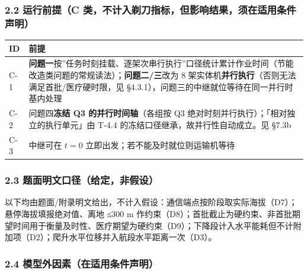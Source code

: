 \documentclass[
  10.5pt,
]{extarticle}
\newcounter{none} %
\begin{document}
\subsubsection{2.2 运行前提（C
类，不计入剃刀指标，但影响结果，须在适用条件声明）}\label{ux8fd0ux884cux524dux63d0c-ux7c7bux4e0dux8ba1ux5165ux5243ux5200ux6307ux6807ux4f46ux5f71ux54cdux7ed3ux679cux987bux5728ux9002ux7528ux6761ux4ef6ux58f0ux660e}

{\def\LTcaptype{none} %
\begin{longtable}[]{@{}
  >{\raggedright\arraybackslash}p{}
  >{\raggedright\arraybackslash}p{}@{}}
\toprule\noalign{}
\begin{minipage}[b]{\linewidth}\raggedright
ID
\end{minipage} & \begin{minipage}[b]{\linewidth}\raggedright
前提
\end{minipage} \\
\midrule\noalign{}
\endhead
\bottomrule\noalign{}
\endlastfoot
C-1 &
\textbf{问题一}按''任务时刻挂载、逐架次串行执行''口径统计累计作业时间（节能改造类问题的常规读法）；\textbf{问题二/三}改为
8 架实体机\textbf{并行执行}（否则无法满足首批/医疗硬时限，见
§4.3.1），问题三的中继就位等待在同一并行时基内处理 \\
C-2 & 问题四\textbf{冻结 Q3 的并行时间轴}（各组按 Q3
绝对时刻并行执行）；「相对独立的执行单元」由 T-4.4
的冻结口径继承，故并行性自动成立。见 §7.3b \\
C-3 & 中继可在 \(t=0\) 立即出发；若不能及时就位则运输机等待 \\
\end{longtable}
}

\subsubsection{2.3
题面明文口径（给定，非假设）}\label{ux9898ux9762ux660eux6587ux53e3ux5f84ux7ed9ux5b9aux975eux5047ux8bbe}

以下均由题面/附录明文给出，不计入假设：通信端点按阶段取实际海拔（D7）；悬停海拔填报绝对值、离地
≤300 m
作约束（D8）；首批截止为硬约束、非首批期望时间用于衡量及时性、医疗期望为硬约束（D9）；下降段计入水平能耗但不计附加项（D2）；爬升水平位移并入航段水平距离一次（D3）。

\subsubsection{2.4
模型外因素（在适用条件声明）}\label{ux6a21ux578bux5916ux56e0ux7d20ux5728ux9002ux7528ux6761ux4ef6ux58f0ux660e}
\end{document}
